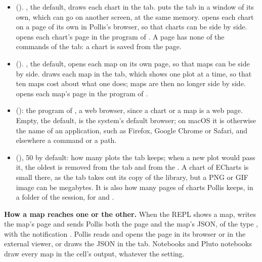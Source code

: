 \begin{itemize}
  \item {} (). , the default, draws each chart
    in the  tab.  puts the  tab in a window of its own, which can go on
    another screen, at the same memory.  opens each chart on a page of its own in Pollis's browser,
    so that charts can be side by side.  opens each chart's page in the program of . A page has none of the commands of the  tab: a chart is saved from the page.
  \item {} (). , the default, opens each map on
    its own page, so that maps can be side by side.  draws each map in the  tab, which shows one
    plot at a time, so that ten maps cost about what one does; maps are then no longer side by side.  opens each map's page in the program of .
  \item {} (): the program of , a web
    browser, since a chart or a map is a web page. Empty, the default, is the system's default browser; on macOS it
    is otherwise the name of an application, such as Firefox, Google Chrome or Safari, and elsewhere a command or a
    path.
  \item {} (), 50 by default: how many plots the  tab
    keeps; when a new plot would pass it, the oldest is removed from the tab and from the . A chart of
    ECharts is small there, as the tab takes out its copy of the library, but a PNG or GIF image can be megabytes. It
    is also how many pages of charts Pollis keeps, in a folder of the session, for  and
    .
\end{itemize}
\textbf{How a map reaches one or the other.} When the REPL shows a map,  writes the map's page and sends
Pollis both the page and the map's JSON, of the type , with the notification
. Pollis reads  and opens the page in its browser or in the external viewer,
or draws the JSON in the  tab. Notebooks and Pluto notebooks draw every map in the cell's output, whatever the setting.

